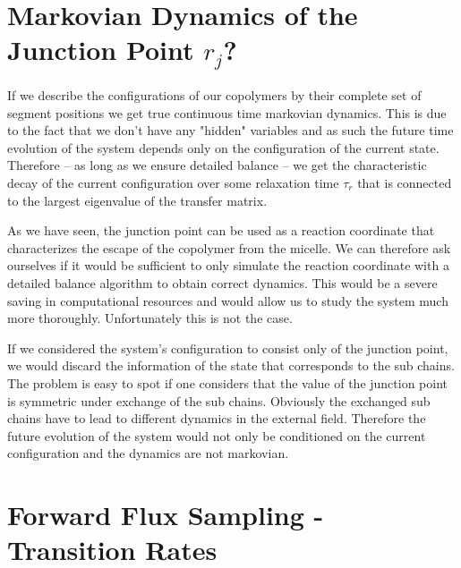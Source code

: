 \documentclass[../main.tex]{subfiles}
\begin{document}
\section{Markovian Dynamics of the Junction Point $r_j$?}

If we describe the configurations of our copolymers by their complete set of segment positions we get true continuous time markovian dynamics.
This is due to the fact that we don't have any "hidden" variables and as such the future time evolution of the system depends only on the configuration of the current state.
Therefore -- as long as we ensure detailed balance -- we get the characteristic decay of the current configuration over some relaxation time $\tau_r$ that is connected to the largest eigenvalue of the transfer matrix.
\par

As we have seen, the junction point can be used as a reaction coordinate that characterizes the escape of the copolymer from the micelle.
We can therefore ask ourselves if it would be sufficient to only simulate the reaction coordinate with a detailed balance algorithm to obtain correct dynamics.
This would be a severe saving in computational resources and would allow us to study the system much more thoroughly.
Unfortunately this is not the case.
\par

If we considered the system's configuration to consist only of the junction point, we would discard the information of the state that corresponds to the sub chains.
The problem is easy to spot if one considers that the value of the junction point is symmetric under exchange of the sub chains.
Obviously the exchanged sub chains have to lead to different dynamics in the external field.
Therefore the future evolution of the system would not only be conditioned on the current configuration and the dynamics are not markovian.
\par

\section{Forward Flux Sampling - Transition Rates}
\end{document}
